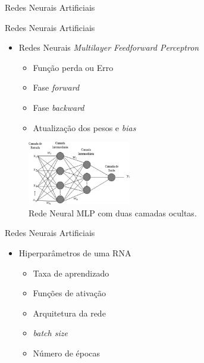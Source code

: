 \begin{frame}{Redes Neurais Artificiais}
   \ \  \\[0.1cm]
   
\end{frame}

\begin{frame}{Redes Neurais Artificiais}
   \ \  \\[0.1cm]
   \begin{itemize}
        \item Redes Neurais \emph{Multilayer Feedforward Perceptron}
        \begin{itemize}
             \item Função perda ou Erro
             \item Fase \emph{forward}
             \item Fase \emph{backward}
             \item Atualização dos pesos e \emph{bias}
        \end{itemize}
   \end{itemize}

   \begin{figure}[ht]
   	\centering
   	\label{fig:mlp}
   	\includegraphics[width=0.4\textwidth]{img/mlprna.jpg}
     \caption{Rede Neural MLP com duas camadas ocultas.}
   \end{figure}
\end{frame}

\begin{frame}{Redes Neurais Artificiais}
   \ \  \\[0.1cm]
   \begin{itemize}
     \item Hiperparâmetros de uma RNA
     \begin{itemize}
       \item Taxa de aprendizado
       \item Funções de ativação
       \item Arquitetura da rede
       \item \emph{batch size}
       \item Número de épocas
     \end{itemize}
   \end{itemize}
\end{frame}

